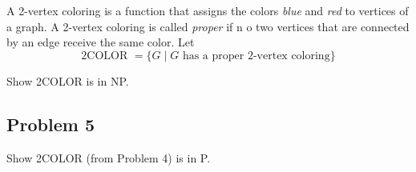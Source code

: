 A 2-vertex coloring is a function that assigns the colors {\em blue\/} and {\em
red\/} to vertices of a graph. A 2-vertex coloring is called {\em proper\/} if n
o two vertices that are connected by an edge receive the same color.
Let
\[ \mbox{2COLOR } = \{ G \mid G \mbox{ has a proper 2-vertex coloring} \} \]

Show 2COLOR is in NP.



\newpage


\subsection*{Problem 5}

Show 2COLOR (from Problem 4) is in P. 


 
